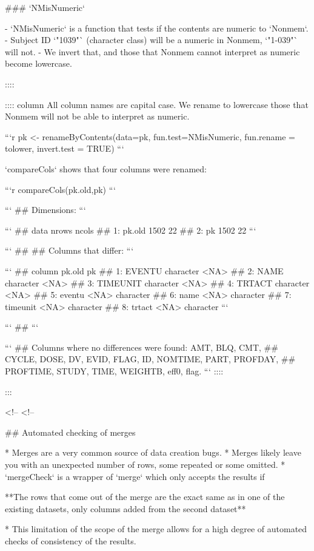 ### `NMisNumeric`

- `NMisNumeric` is a function that tests if the contents are numeric to `Nonmem`. 
- Subject ID `"1039"` (character class) will be a numeric in Nonmem, `"1-039"` will not. 
- We invert that, and those that Nonmem cannot interpret as numeric become lowercase. 

:::: 

:::: column
All column names are capital case. We rename to lowercase those that Nonmem will not be able to interpret as numeric.
\footnotesize



```r
pk <- renameByContents(data=pk,
                       fun.test=NMisNumeric,
                       fun.rename = tolower,
                       invert.test = TRUE)
```

`compareCols` shows that four columns were renamed:


```r
compareCols(pk.old,pk)
```

```
## Dimensions:
```

```
##      data nrows ncols
## 1: pk.old  1502    22
## 2:     pk  1502    22
```

```
## 
## Columns that differ:
```

```
##      column    pk.old        pk
## 1:   EVENTU character      <NA>
## 2:     NAME character      <NA>
## 3: TIMEUNIT character      <NA>
## 4:   TRTACT character      <NA>
## 5:   eventu      <NA> character
## 6:     name      <NA> character
## 7: timeunit      <NA> character
## 8:   trtact      <NA> character
```

```
## 
```

```
## Columns where no differences were found: AMT, BLQ, CMT,
## CYCLE, DOSE, DV, EVID, FLAG, ID, NOMTIME, PART, PROFDAY,
## PROFTIME, STUDY, TIME, WEIGHTB, eff0, flag.
```
\normalsize
::::

:::

<!-- %
<!-- %

## Automated checking of merges

* Merges are a very common source of data creation bugs. 
* Merges likely leave you with an unexpected number of
rows, some repeated or some omitted. 
* `mergeCheck` is a wrapper of `merge` 
which only accepts the results if 

**The rows that come out
of the merge are the exact same as in one of the existing datasets,
only columns added from the second dataset**

* This limitation of the
scope of the merge allows for a high degree of automated checks of
consistency of the results.

